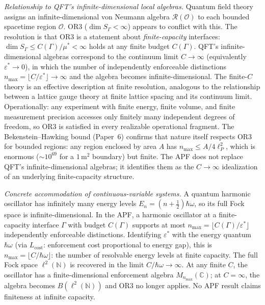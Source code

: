 \documentclass[11pt]{article}
\theoremstyle{remark}
\begin{document}
\smallskip\noindent\textit{Relationship to QFT's infinite-dimensional local algebras.}  Quantum field theory assigns an infinite-dimensional von Neumann algebra $\mathcal{R}(\mathcal{O})$ to each bounded spacetime region $\mathcal{O}$.  OR3 ($\dim S_\Gamma < \infty$) appears to conflict with this.  The resolution is that OR3 is a statement about \emph{finite-capacity} interfaces: $\dim S_\Gamma \le C(\Gamma)/\mu^* < \infty$ holds at any finite budget $C(\Gamma)$.  QFT's infinite-dimensional algebras correspond to the continuum limit $C \to \infty$ (equivalently $\varepsilon^* \to 0$), in which the number of independently enforceable distinctions $n_{\max} = \lfloor C/\varepsilon^* \rfloor \to \infty$ and the algebra becomes infinite-dimensional.  The finite-$C$ theory is an effective description at finite resolution, analogous to the relationship between a lattice gauge theory at finite lattice spacing and its continuum limit.  Operationally: any experiment with finite energy, finite volume, and finite measurement precision accesses only finitely many independent degrees of freedom, so OR3 is satisfied in every realizable operational fragment.  The Bekenstein--Hawking bound (Paper~6) confirms that nature itself respects OR3 for bounded regions: any region enclosed by area $A$ has $n_{\max} \le A/4\ell_P^2$, which is enormous ($\sim 10^{69}$ for a $1\,\mathrm{m}^2$ boundary) but finite.  The APF does not replace QFT's infinite-dimensional algebras; it identifies them as the $C \to \infty$ idealization of an underlying finite-capacity structure.

\smallskip\noindent\textit{Concrete accommodation of continuous-variable systems.}  A quantum harmonic oscillator has infinitely many energy levels $E_n = (n + \tfrac{1}{2})\hbar\omega$, so its full Fock space is infinite-dimensional.  In the APF, a harmonic oscillator at a finite-capacity interface $\Gamma$ with budget $C(\Gamma)$ supports at most $n_{\max} = \lfloor C(\Gamma)/\varepsilon^*\rfloor$ independently enforceable distinctions.  Identifying $\varepsilon^*$ with the energy quantum $\hbar\omega$ (via $L_{\mathrm{cost}}$: enforcement cost proportional to energy gap), this is $n_{\max} = \lfloor C/\hbar\omega \rfloor$: the number of resolvable energy levels at finite capacity.  The full Fock space $\ell^2(\mathbb{N})$ is recovered in the limit $C/\hbar\omega \to \infty$.  At any finite $C$, the oscillator has a finite-dimensional enforcement algebra $M_{n_{\max}}(\mathbb{C})$; at $C = \infty$, the algebra becomes $B(\ell^2(\mathbb{N}))$ and OR3 no longer applies.  No APF result claims finiteness at infinite capacity.
\end{document}
